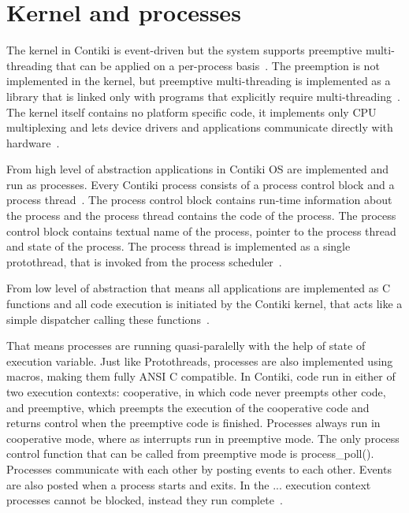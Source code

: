 
\section{Kernel and processes}
The kernel in Contiki is event-driven but the system supports preemptive
multi-threading that can be applied on a per-process basis~\cite{video}.
The preemption is not implemented in the kernel, but
preemptive multi-threading is implemented as a library that is linked only with programs that
explicitly require multi-threading~\cite{paper-contiki}.
The kernel itself contains no platform specific code, it implements only CPU multiplexing and
lets device drivers and applications communicate directly with hardware~\cite{video}.

From high level of abstraction
applications in Contiki OS are implemented and run as processes.
Every Contiki process consists of a process control block and a process thread~\cite{contiki-wiki-processes}.
The process control block contains run-time information about the process and
the process thread contains the code of the process.
The process control block contains
textual name of the process, pointer to the process thread and state of the process.
The process thread is implemented as a single protothread,
that is invoked from the process scheduler~\cite{contiki-wiki-processes}.

From low level of abstraction that means
all applications are implemented as C functions
and all code execution is initiated by the Contiki kernel,
that acts like a simple dispatcher calling these functions~\cite{contiki-docs}.

That means processes are running quasi-paralelly with the help of state of execution variable.
Just like Protothreads, processes are also implemented using macros, making them fully ANSI C compatible.
In Contiki, code run in either of two execution contexts:
cooperative, in which code never preempts other code, and preemptive,
which preempts the execution of the cooperative code and returns control
when the preemptive code is finished.
Processes always run in cooperative mode, where as interrupts run in preemptive mode.
The only process control function that can be called from preemptive mode is process\_poll(). 
Processes communicate with each other by posting events to each other.
Events are also posted when a process starts and exits.
In the ... execution context processes cannot be blocked,
instead they run complete~\cite{video, paper-contiki}.


